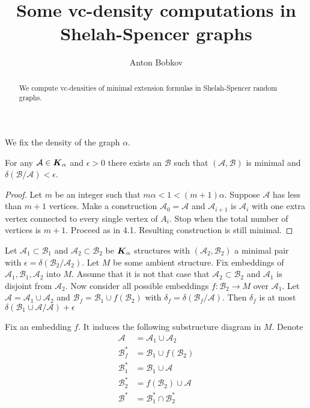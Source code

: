 \documentclass{amsart}
\newcommand{\A}{\mathcal A}
\newcommand{\B}{\mathcal B}
\newcommand{\K}{\boldface K_\alpha}
\begin{document}
\title{Some vc-density computations in Shelah-Spencer graphs}
\author{Anton Bobkov}

\begin{abstract}
	We compute vc-densities of minimal extension formulas in Shelah-Spencer random graphs.
\end{abstract}

\maketitle

We fix the density of the graph $\alpha$.

\begin{Lemma}
	For any $\A \in \K$ and $\epsilon > 0$ there exists an $\B$ such that $(\A, \B)$ is minimal and $\delta(\B/\A) < \epsilon$.
\end{Lemma}

\begin{proof}
	Let $m$ be an integer such that $m\alpha < 1 < (m+1)\alpha$. Suppose $\A$ has less than $m+1$ vertices. Make a construction $\A_0 = \A$ and $\A_{i+1}$ is $\A_i$ with one extra vertex connected to every single vertex of $A_i$. Stop when the total number of vertices is $m+1$. Proceed as in \cite{Laskowski} 4.1. Resulting construction is still minimal.
\end{proof}

\begin{Lemma}
	Let $\A_1 \subset \B_1$ and $\A_2 \subset \B_2$ be $\K$ structures with $(\A_2, \B_2)$ a minimal pair with $\epsilon = \delta (\B_2/\A_2)$. Let $M$ be some ambient structure. Fix embeddings of $\A_1, \B_1, \A_2$ into $M$. Assume that it is not that case that $\A_2 \subset \B_2$ and $\A_1$ is disjoint from $\A_2$. Now consider all possible embeddings $f \colon \B_2 \to M$ over $\A_1$.  Let $\A = \A_1 \cup \A_2$ and $\B_f = \B_1 \cup f(\B_2)$ with $\delta_f = \delta(\B_f/\A)$. Then $\delta_f$ is at most $\delta(\B_1 \cup \A/\A) + \epsilon$
\end{Lemma}

Fix an embedding $f$. It induces the following substructure diagram in $M$. Denote 
\begin{align*}
	\A &= \A_1 \cup \A_2 \\
	\B_f^* &= \B_1 \cup f(\B_2) \\
	\B_1^* &= \B_1 \cup \A \\
	\B_2^* &= f(\B_2) \cup \A \\
	\B^* &= \B_1^* \cap \B_2^*
\end{align*}
\end{document}
